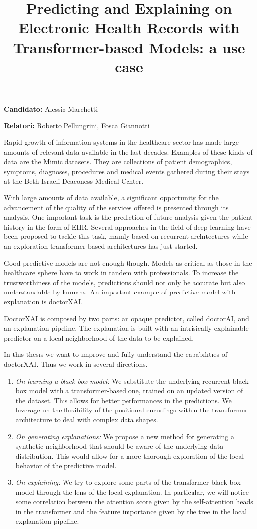 \documentclass[]{marticle}
\title{\vspace{-2cm}\textbf{\huge Predicting and Explaining on Electronic Health Records  with Transformer-based Models: a use case}}
\date{}
\author{}
\begin{document}
\maketitle


\textbf{Candidato:} Alessio Marchetti

\textbf{Relatori:} Roberto Pellungrini, Fosca Giannotti
\vspace{0.5cm}

Rapid growth of information systems in the healthcare sector has made large amounts of relevant data
available in the last decades. Examples of these kinds of data are the Mimic datasets. They are
collections of patient demographics, symptoms, diagnoses, procedures and medical events gathered
during their stays at the Beth Israeli Deaconess Medical Center.

With large amounts of data available, a significant opportunity for the advancement of the quality
of the services offered is presented through its analysis. One important task is the prediction of
future analysis given the patient history in the form of EHR. Several approaches in the field of
deep learning have been proposed to tackle this task, mainly based on recurrent architectures while
an exploration transformer-based architectures has just started.

Good predictive models are not enough though. Models as critical as those in the healthcare sphere
have to work in tandem with professionals. To increase the trustworthiness of the models,
predictions should not only be accurate but also understandable by humans. An important example of
predictive model with explanation is doctorXAI. 

DoctorXAI is composed by two parts: an opaque predictor, called doctorAI, and an explanation
pipeline. The explanation is built with an intrisically explainable predictor on a local
neighborhood of the data to be explained.

In this thesis we want to improve and fully understand the capabilities of doctorXAI. Thus we work
in several directions.
\begin{enumerate}
\item \emph{On learning a black box model:} We substitute the underlying recurrent black-box model
with a transformer-based one, trained on an updated version of the dataset. This allows for better
performances in the predictions. We leverage on the flexibility of the positional encodings within
the transformer architecture to deal with complex data shapes.

\item \emph{On generating explanations:}  We propose a new method for generating a synthetic
neighborhood that should be aware of the underlying data distribution. This would allow for a more
thorough exploration of the local behavior of the predictive model.

\item \emph{On explaining:} We try to explore some parts of the transformer black-box model
through the lens of the local explanation. In particular, we will notice some correlation between the
attention score given by the self-attention heads in the transformer and the feature importance
given by the tree in the local explanation pipeline.
\end{enumerate}
\end{document}
